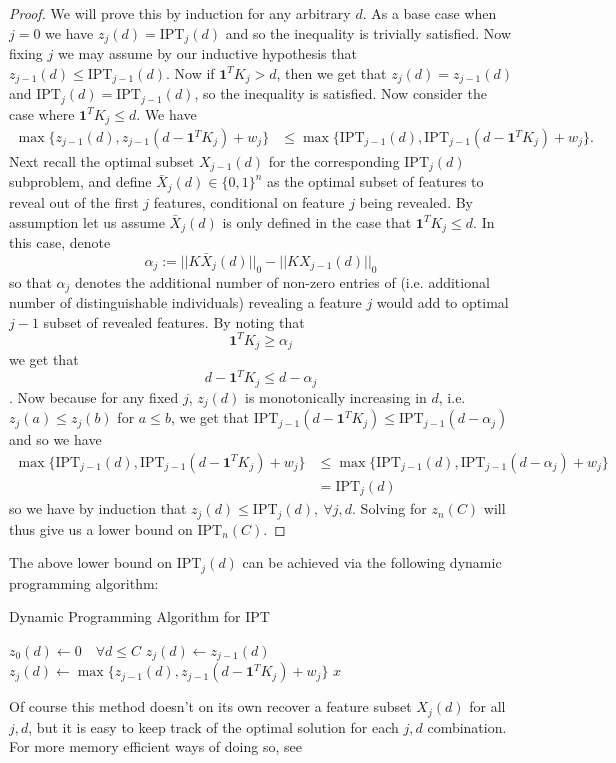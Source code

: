 \documentclass[12pt]{article}
\newcommand{\priv}{\text{IPT}}
\begin{document}
\begin{proof}
    We will prove this by induction for any arbitrary $d$. As a base case when $j = 0$ we have $z_j(d) =\priv_j(d)$ and so the inequality is trivially satisfied. Now fixing $j$ we may assume by our inductive hypothesis that $z_{j-1}(d) \leq \priv_{j-1}(d)$. Now if $\mathbf{1}^TK_j > d$, then we get that $z_{j}(d) = z_{j-1}(d)$ and $\priv_{j}(d) = \priv_{j-1}(d)$, so the inequality is satisfied. Now consider the case where $\mathbf{1}^TK_j \leq d$. We have 
    \begin{align*}
        \max\{z_{j-1}(d), z_{j-1}(d- \mathbf{1}^T K_{j}) + w_j\} &\leq \max\{\priv_{j-1}(d), \priv_{j-1}(d- \mathbf{1}^T K_{j}) + w_j\}.
    \end{align*}
    Next recall the optimal subset $X_{j-1}(d)$ for the corresponding $\priv_j(d)$ subproblem, and define $\bar{X}_j(d) \in \{0,1\}^n$ as the optimal subset of features to reveal out of the first $j$ features, conditional on feature $j$ being revealed. By assumption let us assume $\bar{X}_j(d)$ is only defined in the case that $\mathbf{1}^T K_{j} \leq d$. In this case, denote
    \[\alpha_j := ||K \bar{X}_{j}(d)||_0 - ||K X_{j-1}(d)||_0\]
    so that $\alpha_j$ denotes the additional number of non-zero entries of (i.e. additional number of distinguishable individuals) revealing a feature $j$ would add to optimal $j-1$ subset of revealed features. By noting that \[\mathbf{1}^TK_j \geq \alpha_j\] we get that \[d - \mathbf{1}^TK_j \leq d - \alpha_j\].  Now because for any fixed $j$, $z_j(d)$ is monotonically increasing in $d$, i.e. $z_j(a) \leq z_j(b)$ for $a\leq b$, we get that $ \priv_{j-1}(d- \mathbf{1}^T K_{j}) \leq \priv_{j-1}(d- \alpha_j)$ and so we have
    \begin{align*}
        \max\{\priv_{j-1}(d), \priv_{j-1}(d- \mathbf{1}^T K_{j}) + w_j\} &\leq  \max\{\priv_{j-1}(d),\priv_{j-1}(d- \alpha_j) + w_j\} \\
        & = \priv_{j}(d)
    \end{align*}
    so we have by induction that  $z_j(d) \leq \priv_j(d), \ \forall j,d$. Solving for $z_n(C)$ will thus give us a lower bound on $\priv_n(C)$.
\end{proof}
The above lower bound on  $\priv_j(d)$ can be achieved via the following dynamic programming algorithm:
\begin{algorithm}
    \caption{Dynamic Programming Algorithm for \gls{IPT}}\label{alg:dp}
    \begin{algorithmic}
        \State $z_0(d) \gets 0 \quad \forall d\leq C$
                \State $z_j(d) \gets z_{j-1}(d)$
            \Else
                \State $z_j(d) \gets  \max\{z_{j-1}(d), z_{j-1}(d- \mathbf{1}^T K_{j}) + w_j\}$
            \EndIf
            \EndFor
        \EndFor
        \Return $x$
        \end{algorithmic}
\end{algorithm}
Of course this method doesn't on its own recover a feature subset $X_j(d)$ for all $j,d$, but it is easy to keep track of the optimal solution for each $j,d$ combination. For more memory efficient ways of doing so, see \cite{KelPfePis04}
\end{document}
